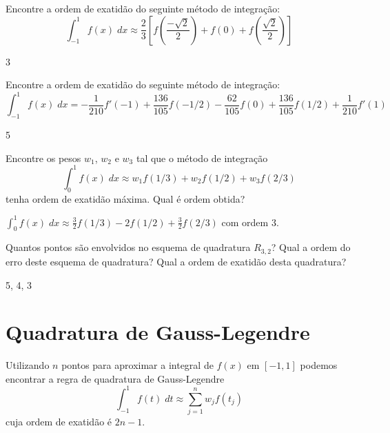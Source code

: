 \begin{exer}
Encontre a ordem de exatidão do seguinte método de integração:
$$\int_{-1}^1f(x)\;dx\approx \frac{2}{3}\left[f\left(\frac{-\sqrt{2}}{2}\right)+f(0)+f\left(\frac{\sqrt{2}}{2}\right)\right]$$
\end{exer}
\begin{resp}
  
3    
  
\end{resp}


\begin{exer}
Encontre a ordem de exatidão do seguinte método de integração:
$$\int_{-1}^1f(x)\;dx=-\frac{1}{210}f'(-1)+\frac{136}{105} f(-1/2) - \frac{62}{105} f(0) + \frac{136}{105}f(1/2) +\frac{1}{210}f'(1)$$
\end{exer}
\begin{resp}
  
5    
  
\end{resp}

\begin{exer} Encontre os pesos $w_1$, $w_2$ e $w_3$ tal que o método de integração
$$\int_0^1 f(x)\;dx \approx w_1 f(1/3)  + w_2f(1/2) + w_3f(2/3)$$
tenha ordem de exatidão máxima. Qual é ordem obtida?
\end{exer}
\begin{resp}
  
$\int_0^1 f(x)\;dx \approx \frac{3}{2} f(1/3)  -2f(1/2) + \frac{3}{2}f(2/3)$ com ordem 3.    
  
\end{resp}

\begin{exer}
Quantos pontos são envolvidos no esquema de quadratura $R_{3,2}$? Qual a ordem do erro deste esquema de quadratura? Qual a ordem de exatidão desta quadratura?
\end{exer}
\begin{resp}
  
 5, 4, 3    
  
\end{resp}


\section{Quadratura de Gauss-Legendre}

Utilizando $n$ pontos para aproximar a integral de $f(x)$ em $[-1,1]$ podemos encontrar a regra de quadratura de Gauss-Legendre 
$$\int_{-1}^1 f(t)\;dt \approx \sum_{j=1}^n w_j f(t_j)$$
cuja ordem de exatidão é $2n-1$. 

